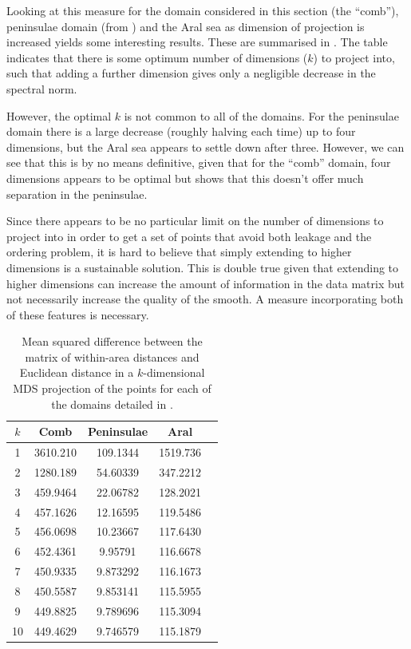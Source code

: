 {%
Looking at this measure for the domain considered in this section (the ``comb''), peninsulae domain (from ) and the Aral sea as dimension of projection is increased yields some interesting results. These are summarised in . The table indicates that there is some optimum number of dimensions ($k$) to project into, such that adding a further dimension gives only a negligible decrease in the spectral norm. 

However, the optimal $k$ is not common to all of the domains. For the peninsulae domain there is a large decrease (roughly halving each time) up to four dimensions, but the Aral sea appears to settle down after three. However, we can see that this is by no means definitive, given that for the ``comb'' domain, four dimensions appears to be optimal but  shows that this doesn't offer much separation in the peninsulae.

Since there appears to be no particular limit on the number of dimensions to project into in order to get a set of points that avoid both leakage and the ordering problem, it is hard to believe that simply extending to higher dimensions is a sustainable solution. This is double true given that extending to higher dimensions can increase the amount of information in the data matrix but not necessarily increase the quality of the smooth. A measure incorporating both of these features is necessary.

\begin{table}[htb]
\centering
\begin{tabular}{c c c c c}
$k$ & Comb  & Peninsulae & Aral\\ 
\hline
1  &  3610.210  &  109.1344  &  1519.736 \\ 
2  &  1280.189  &  54.60339  &  347.2212 \\ 
3  &  459.9464  &  22.06782  &  128.2021 \\ 
4  &  457.1626  &  12.16595  &  119.5486 \\ 
5  &  456.0698  &  10.23667  &  117.6430 \\ 
6  &  452.4361  &  9.95791  &  116.6678 \\ 
7  &  450.9335  &  9.873292  &  116.1673 \\ 
8  &  450.5587  &  9.853141  &  115.5955 \\ 
9  &  449.8825  &  9.789696  &  115.3094 \\ 
10  &  449.4629 &  9.746579  &  115.1879 \\ 
\end{tabular}
\caption{Mean squared difference between the matrix of within-area distances and Euclidean distance in a $k$-dimensional MDS projection of the points for each of the domains detailed in .}
\label{increasek}
\end{table}

}
